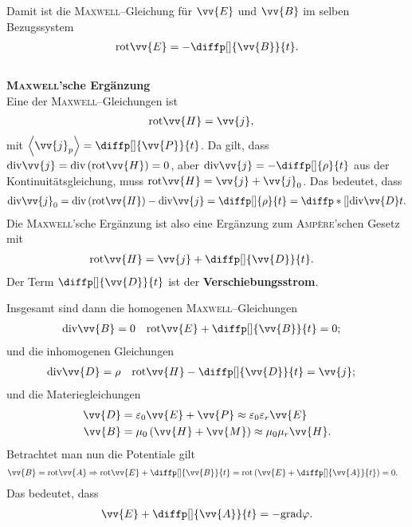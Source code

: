 \documentclass[a4paper,12pt]{article}
\numberwithin{equation}{section}
\begin{document}
Damit ist die \textsc{Maxwell}--Gleichung für $\vv{E}$ und $\vv{B}$ im selben Bezugssystem
\begin{align} 
        \text{rot}\vv{E}=-\diffp[]{\vv{B}}{t}
.\end{align} 
\hfill\\\textbf{\textsc{Maxwell}'sche Ergänzung}\\ 
Eine der \textsc{Maxwell}--Gleichungen ist
\begin{align} 
        \text{rot}\vv{H}&=\vv{j}
,\end{align} 
mit $\left\langle \vv{j}_p\right\rangle =\diffp[]{\vv{P}}{t}$. 
Da gilt, dass $\text{div}\vv{j}=\text{div}\left(\text{rot}\vv{H}\right)=0$, aber $\text{div}\vv{j}=-\diffp[]{\rho }{t}$ aus der Kontinuitätsgleichung, muss $\text{rot}\vv{H}=\vv{j}+\vv{j}_0$.
Das bedeutet, dass
\begin{align} 
        \text{div}\vv{j}_0=\text{div}\left(\text{rot}\vv{H}\right)-\text{div}\vv{j}=\diffp[]{\rho }{t}=\diffp*[]{\text{div}\vv{D}}{t}
.\end{align} 
Die \textsc{Maxwell}'sche Ergänzung ist also eine Ergänzung zum \textsc{Amp\`ere}'schen Gesetz mit
\begin{align} 
        \text{rot}\vv{H}&=\vv{j}+\diffp[]{\vv{D}}{t}
.\end{align} 
Der Term $\diffp[]{\vv{D}}{t}$ ist der \textbf{Verschiebungsstrom}.\par
Insgesamt sind dann die homogenen \textsc{Maxwell}--Gleichungen
\begin{align} 
        \text{div}\vv{B}&=0&\text{rot}\vv{E}+\diffp[]{\vv{B}}{t}&=0
;\end{align} 
und die inhomogenen Gleichungen
\begin{align} 
        \text{div}\vv{D}&=\rho &\text{rot}\vv{H}-\diffp[]{\vv{D}}{t}&=\vv{j}
;\end{align} 
und die Materiegleichungen
\begin{align} 
        \vv{D}&=\varepsilon _0\vv{E}+\vv{P}\approx \varepsilon _0\varepsilon _r\vv{E}\\
        \vv{B}&=\mu _0\left(\vv{H}+\vv{M}\right)\approx \mu _0\mu _r\vv{H}
.\end{align} 
Betrachtet man nun die Potentiale gilt
\begin{align} 
        \vv{B}&=\text{rot}\vv{A}\Rightarrow \text{rot}\vv{E}+\diffp[]{\vv{B}}{t}=\text{rot}\left(\vv{E}+\diffp[]{\vv{A}}{t}\right)=0
.\end{align} 
Das bedeutet, dass
\begin{align} 
        \vv{E}+\diffp[]{\vv{A}}{t}=-\text{grad}\varphi 
.\end{align} 
\end{document}
